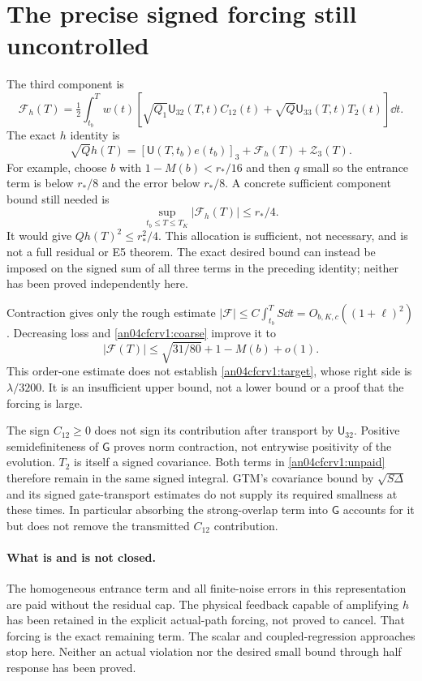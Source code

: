 \documentclass[11pt]{article}
\begin{document}
\section{The precise signed forcing still uncontrolled}
The third component is
\begin{equation}\label{an04cfcrv1:unpaid}
 \boxed{\quad
 \mathcal F_h(T)=\tfrac12\int_{t_b}^T w(t)
 \left[\sqrt{Q_1}\mathsf U_{32}(T,t)C_{12}(t)
       +\sqrt Q\mathsf U_{33}(T,t)T_2(t)\right]\dd t.\quad}
\end{equation}
The exact $h$ identity is
\[
 \sqrt Qh(T)=[\mathsf U(T,t_b)e(t_b)]_3
                        +\mathcal F_h(T)+\mathcal Z_3(T).
\]
For example, choose $b$ with $1-M(b)<r_*/16$ and then $q$
small so the entrance term is below $r_*/8$ and the error below
$r_*/8$. A concrete sufficient component bound still needed is
\begin{equation}\label{an04cfcrv1:target}
 \sup_{t_b\le T\le T_K}|\mathcal F_h(T)|\le r_*/4.
\end{equation}
It would give $Qh(T)^2\le r_*^2/4$. This allocation is sufficient,
not necessary, and is not a full residual or E5 theorem.
The exact desired bound can instead be imposed on the signed sum
of all three terms in the preceding identity; neither has been
proved independently here.

Contraction gives only the rough estimate
$|\mathcal F|\le C\int_{t_b}^TS\dd t=O_{b,K,c}((1+\ell)^2)$.
Decreasing loss and \eqref{an04cfcrv1:coarse} improve it to
\begin{equation}\label{an04cfcrv1:insufficient}
 |\mathcal F(T)|\le\sqrt{31/80}+1-M(b)+o(1).
\end{equation}
This order-one estimate does not establish
\eqref{an04cfcrv1:target}, whose right side is $\lambda/3200$.
It is an insufficient upper bound, not a lower bound or a proof
that the forcing is large.

The sign $C_{12}\ge0$ does not sign its contribution after
transport by $\mathsf U_{32}$. Positive semidefiniteness of
$\mathsf G$ proves norm contraction, not entrywise positivity of
the evolution. $T_2$ is itself a signed covariance. Both terms
in \eqref{an04cfcrv1:unpaid} therefore remain in the same signed
integral. GTM's covariance bound by $\sqrt{S\Delta}$ and its signed
gate-transport estimates do not supply its required smallness at
these times. In particular absorbing the strong-overlap term into
$\mathsf G$ accounts for it but does not remove the transmitted
$C_{12}$ contribution.

\paragraph{What is and is not closed.}
The homogeneous entrance term and all finite-noise errors in this
representation are paid without the residual cap. The physical
feedback capable of amplifying $h$ has been retained in the
explicit actual-path forcing, not proved to cancel. That forcing
is the exact remaining term. The scalar and coupled-regression
approaches stop here. Neither an actual violation nor the desired
small bound through half response has been proved.
\end{document}
